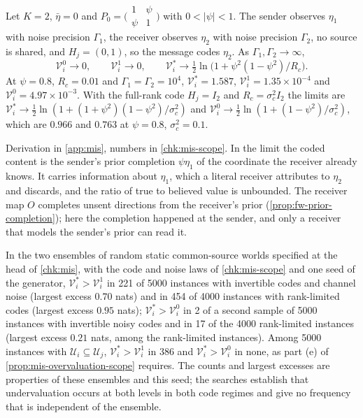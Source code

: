 \begin{example}\label{ex:mis-sender-completion}
Let $K=2$, $\bar\eta=0$ and $P_0=\bigl(\begin{smallmatrix}1&\psi\\\psi&1\end{smallmatrix}\bigr)$ with $0<\lvert\psi\rvert<1$. The sender observes $\eta_1$ with noise precision $\Gamma_1$, the receiver observes $\eta_2$ with noise precision $\Gamma_2$, no source is shared, and $H_j=(0,1)$, so the message codes $\eta_2$. As $\Gamma_1,\Gamma_2\to\infty$,
\begin{equation}\label{eq:mis-completion}
\mathcal V^0_i\to0,\qquad\mathcal V^1_i\to0,\qquad\mathcal V^\ast_i\to\tfrac12\ln\bigl(1+\psi^2(1-\psi^2)/R_c\bigr).
\end{equation}
At $\psi=0.8$, $R_c=0.01$ and $\Gamma_1=\Gamma_2=10^4$, $\mathcal V^\ast_i=1.587$, $\mathcal V^1_i=1.35\times10^{-4}$ and $\mathcal V^0_i=4.97\times10^{-3}$. With the full-rank code $H_j=I_2$ and $R_c=\sigma_c^2I_2$ the limits are $\mathcal V^\ast_i\to\tfrac12\ln(1+(1+\psi^2)(1-\psi^2)/\sigma_c^2)$ and $\mathcal V^0_i\to\tfrac12\ln(1+(1-\psi^2)/\sigma_c^2)$, which are $0.966$ and $0.763$ at $\psi=0.8$, $\sigma_c^2=0.1$.
\end{example}

Derivation in \cref{app:mis}, numbers in \cref{chk:mis-scope}. In the limit the coded content is the sender's prior completion $\psi\eta_1$ of the coordinate the receiver already knows. It carries information about $\eta_1$, which a literal receiver attributes to $\eta_2$ and discards, and the ratio of true to believed value is unbounded. The receiver map $O$ completes unsent directions from the receiver's prior (\cref{prop:fw-prior-completion}); here the completion happened at the sender, and only a receiver that models the sender's prior can read it.

\begin{observation}\label{obs:mis-random-codes}
In the two ensembles of random static common-source worlds specified at the head of \cref{chk:mis}, with the code and noise laws of \cref{chk:mis-scope} and one seed of the generator, $\mathcal V^\ast_i>\mathcal V^1_i$ in 221 of 5000 instances with invertible codes and channel noise (largest excess $0.70$ nats) and in 454 of 4000 instances with rank-limited codes (largest excess $0.95$ nats); $\mathcal V^\ast_i>\mathcal V^0_i$ in 2 of a second sample of 5000 instances with invertible noisy codes and in 17 of the 4000 rank-limited instances (largest excess $0.21$ nats, among the rank-limited instances). Among 5000 instances with $\mathcal U_i\subseteq\mathcal U_j$, $\mathcal V^\ast_i>\mathcal V^1_i$ in 386 and $\mathcal V^\ast_i>\mathcal V^0_i$ in none, as part (e) of \cref{prop:mis-overvaluation-scope} requires. The counts and largest excesses are properties of these ensembles and this seed; the searches establish that undervaluation occurs at both levels in both code regimes and give no frequency that is independent of the ensemble.
\end{observation}

